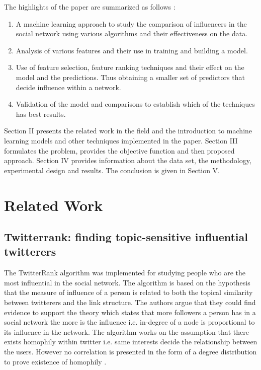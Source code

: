 The highlights of the paper are summarized as follows :\\

\begin{enumerate}
  \item A machine learning approach to study the comparison of influencers in the social network using various algorithms and their effectiveness on the data.
  \item Analysis of various features and their use in training and building a model.
        \item Use of feature selection, feature ranking techniques and their effect on the model and the predictions. Thus obtaining a smaller set of predictors that decide influence within a network.
        \item Validation of the model and comparisons to establish which of the techniques has best results. 
        \\
\end{enumerate}
	

Section II presents the related work in the field and the introduction to machine learning models and other techniques implemented in the paper. Section III formulates the problem, provides the objective function and then proposed approach. Section IV provides information about the data set, the methodology, experimental design and results. The conclusion is given in Section V.

\section{Related Work}

\subsection{Twitterrank: finding topic-sensitive influential twitterers}
The TwitterRank algorithm was implemented for studying people who are the most influential in the social network. The algorithm is based on the hypothesis that the measure of influence of a person is related to both the topical similarity between twitterers and the link structure. The authors argue that they could find evidence to support the theory which states that more followers a person has in a social network the more is the influence i.e. in-degree of a node is proportional to its influence in the network. The algorithm works on the assumption that there exists homophily within twitter i.e. same interests decide the relationship between the users. However no correlation is presented in the form of a degree distribution to prove existence of homophily \cite{aps:20} \cite{aps:16}. 


